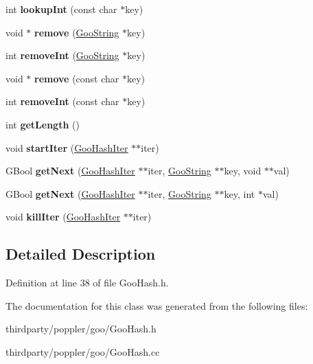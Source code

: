 \begin{DoxyCompactItemize}
\mbox{\label{class_goo_hash_ab418d51818cdf4c411deac3e3aac6b69}} 
int {\bfseries lookup\+Int} (const char $\ast$key)
\item 
\mbox{\label{class_goo_hash_a2f86545397fa299b37c45fd4b4ccb463}} 
void $\ast$ {\bfseries remove} (\hyperlink{class_goo_string}{Goo\+String} $\ast$key)
\item 
\mbox{\label{class_goo_hash_a17d59eba1f3b83706e9202bf71c849dd}} 
int {\bfseries remove\+Int} (\hyperlink{class_goo_string}{Goo\+String} $\ast$key)
\item 
\mbox{\label{class_goo_hash_a959ba938c61cd82d6e8aa073d05f0937}} 
void $\ast$ {\bfseries remove} (const char $\ast$key)
\item 
\mbox{\label{class_goo_hash_a1bf4d55dbd8f6bc074183cd6dcac70ce}} 
int {\bfseries remove\+Int} (const char $\ast$key)
\item 
\mbox{\label{class_goo_hash_a0b0b1149d33ae2e0a19d4bb34a4f068e}} 
int {\bfseries get\+Length} ()
\item 
\mbox{\label{class_goo_hash_ab7aa64f3db58fd536130d7e4a870a9bc}} 
void {\bfseries start\+Iter} (\hyperlink{struct_goo_hash_iter}{Goo\+Hash\+Iter} $\ast$$\ast$iter)
\item 
\mbox{\label{class_goo_hash_a7ef2e8571515798125a8805c1a92714a}} 
G\+Bool {\bfseries get\+Next} (\hyperlink{struct_goo_hash_iter}{Goo\+Hash\+Iter} $\ast$$\ast$iter, \hyperlink{class_goo_string}{Goo\+String} $\ast$$\ast$key, void $\ast$$\ast$val)
\item 
\mbox{\label{class_goo_hash_a647954ccbb39f31b26740cdeb6ebdcb7}} 
G\+Bool {\bfseries get\+Next} (\hyperlink{struct_goo_hash_iter}{Goo\+Hash\+Iter} $\ast$$\ast$iter, \hyperlink{class_goo_string}{Goo\+String} $\ast$$\ast$key, int $\ast$val)
\item 
\mbox{\label{class_goo_hash_a604eb72f2b59cad027209db59a86a169}} 
void {\bfseries kill\+Iter} (\hyperlink{struct_goo_hash_iter}{Goo\+Hash\+Iter} $\ast$$\ast$iter)
\end{DoxyCompactItemize}


\subsection{Detailed Description}


Definition at line 38 of file Goo\+Hash.\+h.



The documentation for this class was generated from the following files\+:\begin{DoxyCompactItemize}
\item 
thirdparty/poppler/goo/Goo\+Hash.\+h\item 
thirdparty/poppler/goo/Goo\+Hash.\+cc\end{DoxyCompactItemize}
